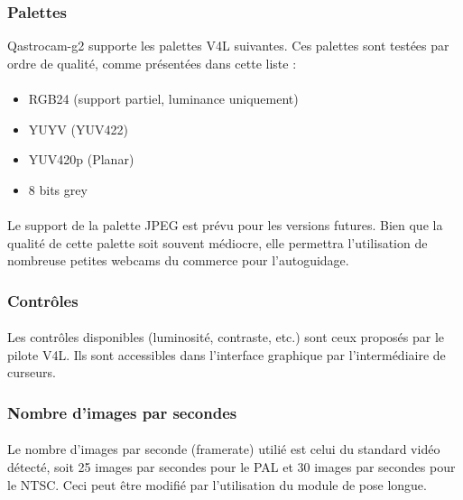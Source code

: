 \documentclass[11pt,a4paper]{book}
\begin{document}
\subsubsection{Palettes}

Qastrocam-g2 supporte les palettes V4L suivantes. Ces palettes sont test\'ees par ordre de qualit\'e,
comme pr\'esent\'ees dans cette liste :

\paragraph*{}
\begin{itemize}
\item RGB24 (support partiel, luminance uniquement)
\item YUYV (YUV422)
\item YUV420p (Planar)
\item 8 bits grey
\end{itemize}

\paragraph*{}
Le support de la palette JPEG est pr\'evu pour les versions futures. Bien que la qualit\'e
de cette palette soit souvent m\'ediocre, elle permettra l'utilisation de nombreuse petites
webcams du commerce pour l'autoguidage.

\subsubsection{Contr\^oles}

\paragraph*{}
Les contr\^oles disponibles (luminosit\'e, contraste, etc.) sont ceux propos\'es par le pilote
V4L. Ils sont accessibles dans l'interface graphique par l'interm\'ediaire de curseurs.

\subsubsection{Nombre d'images par secondes}

\paragraph*{}
Le nombre d'images par seconde (framerate) utili\'e est celui du standard vid\'eo d\'etect\'e,
soit 25 images par secondes pour le PAL et 30 images par secondes pour le NTSC. Ceci peut \^etre
modifi\'e par l'utilisation du module de pose longue.  
\end{document}
